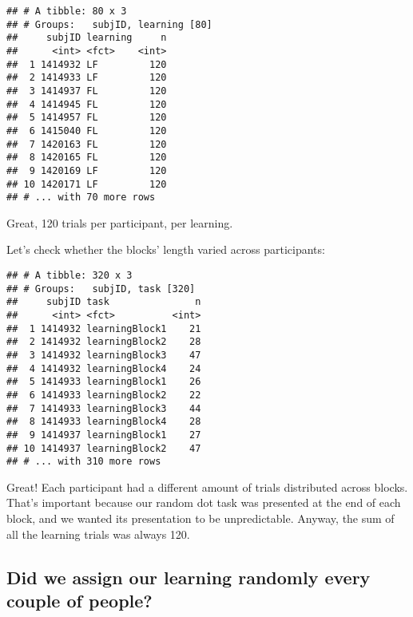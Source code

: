 \documentclass[
]{article}
\newenvironment{Shaded}{\begin{snugshade}}{\end{snugshade}}
\newcommand{\KeywordTok}[1]{\textcolor[rgb]{0.13,0.29,0.53}{\textbf{#1}}}
\newcommand{\NormalTok}[1]{#1}
\newcommand{\OperatorTok}[1]{\textcolor[rgb]{0.81,0.36,0.00}{\textbf{#1}}}
\newcommand{\StringTok}[1]{\textcolor[rgb]{0.31,0.60,0.02}{#1}}
\begin{document}
\begin{verbatim}
## # A tibble: 80 x 3
## # Groups:   subjID, learning [80]
##     subjID learning     n
##      <int> <fct>    <int>
##  1 1414932 LF         120
##  2 1414933 LF         120
##  3 1414937 FL         120
##  4 1414945 FL         120
##  5 1414957 FL         120
##  6 1415040 FL         120
##  7 1420163 FL         120
##  8 1420165 FL         120
##  9 1420169 LF         120
## 10 1420171 LF         120
## # ... with 70 more rows
\end{verbatim}

Great, 120 trials per participant, per learning.

Let's check whether the blocks' length varied across participants:

\begin{Shaded}
\end{Shaded}

\begin{verbatim}
## # A tibble: 320 x 3
## # Groups:   subjID, task [320]
##     subjID task               n
##      <int> <fct>          <int>
##  1 1414932 learningBlock1    21
##  2 1414932 learningBlock2    28
##  3 1414932 learningBlock3    47
##  4 1414932 learningBlock4    24
##  5 1414933 learningBlock1    26
##  6 1414933 learningBlock2    22
##  7 1414933 learningBlock3    44
##  8 1414933 learningBlock4    28
##  9 1414937 learningBlock1    27
## 10 1414937 learningBlock2    47
## # ... with 310 more rows
\end{verbatim}

Great! Each participant had a different amount of trials distributed
across blocks. That's important because our random dot task was
presented at the end of each block, and we wanted its presentation to be
unpredictable. Anyway, the sum of all the learning trials was always
120.

\hypertarget{did-we-assign-our-learning-randomly-every-couple-of-people}{%
\subsection{Did we assign our learning randomly every couple of
people?}\label{did-we-assign-our-learning-randomly-every-couple-of-people}}
\end{document}
